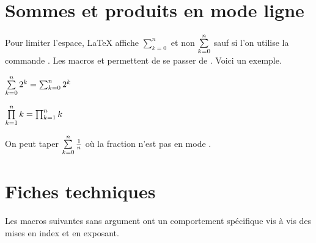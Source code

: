 \documentclass[12pt,a4paper]{article}
\begin{document}
\section{Sommes et produits en mode ligne}

Pour limiter l'espace, \LaTeX{} affiche $\sum_{k=0}^{n}$ et non $\sum\limits_{k=0}^{n}$ sauf si l'on utilise la commande .
Les macros  et  permettent de se passer de .
Voici un exemple.


\begin{latexex}
 $\sum\limits_{k=0}^{n} 2^k
= \sum_{k=0}^{n} 2^k$

 $\prod\limits_{k=1}^{n} k
= \prod_{k=1}^{n} k$
\end{latexex}


\begin{remark}
	On peut taper  $\sum\limits_{k=0}^{n} \frac{1}{n}$ où la fraction n'est pas en mode .
\end{remark}




\section{Fiches techniques}

Les macros suivantes sans argument ont un comportement spécifique vis à vis des mises en index et en exposant. 


\separation



\end{document}
